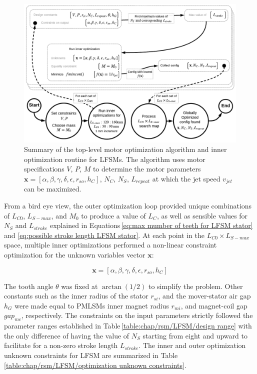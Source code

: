                 
                \begin{figure}
                  \centering
                  \includegraphics[width=5.9in]{chap4/images2/RSM_LFSM_optimization.pdf}
                  \caption{Summary of the top-level motor optimization algorithm and inner optimization routine for \acsp{LFSM}. The algorithm uses motor specifications $V$, $P$, $M$ to determine the motor parameters $\textbf{x}=[\alpha,\beta,\gamma,\delta,\epsilon,r_{so},h_C]$, $N_C$, $N_S$, $L_{repeat}$ at which the jet speed $v_{jet}$ can be maximized.}
                  \label{fig:chapter/rsm/fsm/top level optmization}
                \end{figure}
                
                
                From a bird eye view, the outer optimization loop provided unique combinations of $L_{C0}$, $L_{S-max}$, and $M_0$ to produce a value of $L_C$, as well as sensible values for $N_S$ and $L_{stroke}$ explained in Equations\,\ref{eq:max mumber of teeth for LFSM stator} and \ref{eq:possible stroke length LFSM stator}. At each point in the $L_{C0} \times L_{S-max}$ space, multiple inner optimizations performed a non-linear constraint optimization for the unknown variables vector $\textbf{x}$:
            
            
                \begin{equation}
                    \textbf{x} = \left[ \alpha,\beta,\gamma,\delta,\epsilon,r_{so},h_{C} \right]
                    \label{eq:inner optimization x of FSM}
                \end{equation}
                
                
                The tooth angle $\theta$ was fixed at $\arctan(1/2)$ to simplify the problem. Other constants such as the inner radius of the stator $r_{si}$, and the mover-stator air gap $h_G$ were made equal to \acsp{PMLSM} inner magnet radius $r_{mi}$, and magnet-coil gap $gap_{mc}$, respectively. The constraints on the input parameters strictly followed the parameter ranges established in Table\,\ref{table:chap/rsm/LFSM/design range} with the only difference of having the value of $N_S$ starting from eight and upward to facilitate for a non-zero stroke length $L_{stroke}$. The inner and outer optimization unknown constraints for \acs{LFSM} are summarized in Table\,\ref{table:chap/rsm/LFSM/optimization unknown constraints}.
                

